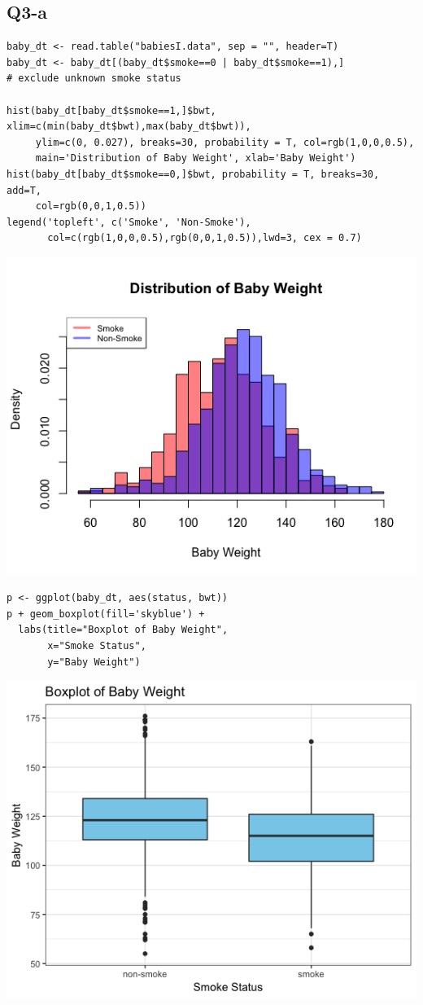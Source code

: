 \documentclass[12pt,letterpaper]{article}
\begin{document}
\subsection*{Q3-a}

\begin{verbatim}
baby_dt <- read.table("babiesI.data", sep = "", header=T)
baby_dt <- baby_dt[(baby_dt$smoke==0 | baby_dt$smoke==1),] 
# exclude unknown smoke status

hist(baby_dt[baby_dt$smoke==1,]$bwt, xlim=c(min(baby_dt$bwt),max(baby_dt$bwt)), 
     ylim=c(0, 0.027), breaks=30, probability = T, col=rgb(1,0,0,0.5),
     main='Distribution of Baby Weight', xlab='Baby Weight')
hist(baby_dt[baby_dt$smoke==0,]$bwt, probability = T, breaks=30, add=T, 
     col=rgb(0,0,1,0.5))
legend('topleft', c('Smoke', 'Non-Smoke'), 
       col=c(rgb(1,0,0,0.5),rgb(0,0,1,0.5)),lwd=3, cex = 0.7)
\end{verbatim}

\includegraphics[width=150mm]{hist_babywt}

\begin{verbatim}
p <- ggplot(baby_dt, aes(status, bwt))
p + geom_boxplot(fill='skyblue') +
  labs(title="Boxplot of Baby Weight", 
       x="Smoke Status",
       y="Baby Weight") 
\end{verbatim}

\includegraphics[width=150mm]{boxplot_babywt}
\end{document}
